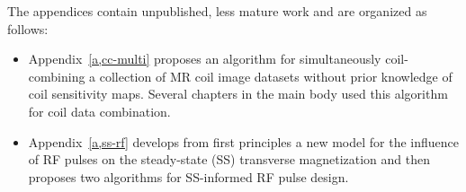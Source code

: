 \vspace{0.5em}
{\setlength{\parindent}{0ex}
The appendices contain unpublished, less mature work
and are organized as follows:}
\begin{itemize}
	\setlength\itemsep{0.5em}
	\item{%
		Appendix~\ref{a,cc-multi} proposes an algorithm
		for simultaneously coil-combining 
		a collection of MR coil image datasets
		without prior knowledge 
		of coil sensitivity maps.
		Several chapters in the main body 
		used this algorithm for coil data combination.
	}%
	\item{%
		Appendix~\ref{a,ss-rf} develops 
		from first principles a new model
		for the influence of RF pulses
		on the steady-state (SS) transverse magnetization
		and then proposes two algorithms
		for SS-informed RF pulse design.
	}%
\end{itemize}
